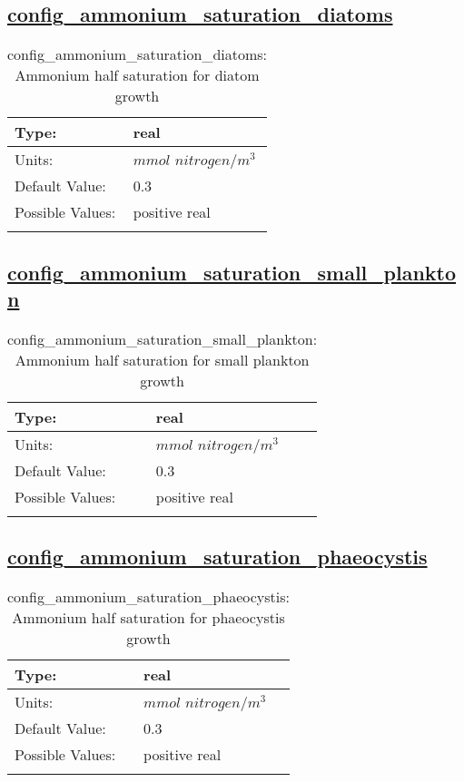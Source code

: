 \subsection[config\_ammonium\_saturation\_diatoms]{\hyperref[sec:nm_tab_biogeochemistry]{config\_ammonium\_saturation\_diatoms}}
\label{subsec:nm_sec_config_ammonium_saturation_diatoms}
\begin{center}
\begin{longtable}{| p{2.0in} || p{4.0in} |}
    \hline
    Type: & real \\
    \hline
    Units: & $mmol$ $nitrogen/m^3$ \\
    \hline
    Default Value: & 0.3 \\
    \hline
    Possible Values: & positive real \\
    \hline
    \caption{config\_ammonium\_saturation\_diatoms: Ammonium half saturation for diatom growth}
\end{longtable}
\end{center}
\subsection[config\_ammonium\_saturation\_small\_plankton]{\hyperref[sec:nm_tab_biogeochemistry]{config\_ammonium\_saturation\_small\_plankton}}
\label{subsec:nm_sec_config_ammonium_saturation_small_plankton}
\begin{center}
\begin{longtable}{| p{2.0in} || p{4.0in} |}
    \hline
    Type: & real \\
    \hline
    Units: & $mmol$ $nitrogen/m^3$ \\
    \hline
    Default Value: & 0.3 \\
    \hline
    Possible Values: & positive real \\
    \hline
    \caption{config\_ammonium\_saturation\_small\_plankton: Ammonium half saturation for small plankton growth}
\end{longtable}
\end{center}
\subsection[config\_ammonium\_saturation\_phaeocystis]{\hyperref[sec:nm_tab_biogeochemistry]{config\_ammonium\_saturation\_phaeocystis}}
\label{subsec:nm_sec_config_ammonium_saturation_phaeocystis}
\begin{center}
\begin{longtable}{| p{2.0in} || p{4.0in} |}
    \hline
    Type: & real \\
    \hline
    Units: & $mmol$ $nitrogen/m^3$ \\
    \hline
    Default Value: & 0.3 \\
    \hline
    Possible Values: & positive real \\
    \hline
    \caption{config\_ammonium\_saturation\_phaeocystis: Ammonium half saturation for phaeocystis growth}
\end{longtable}
\end{center}

